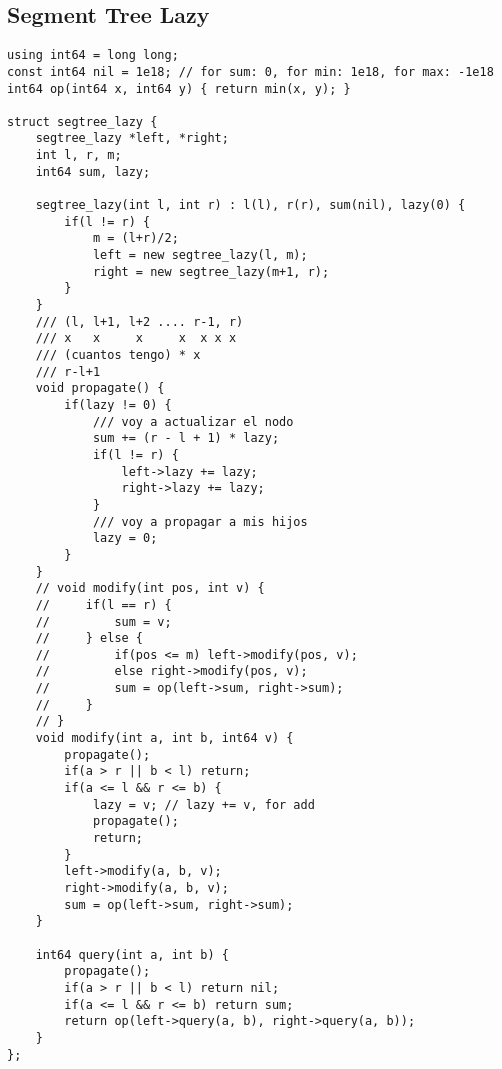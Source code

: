 \documentclass[10pt,letterpaper,twocolumn,twosided]{article}
\begin{document}
\subsection{Segment Tree Lazy}
\begin{lstlisting}
using int64 = long long;
const int64 nil = 1e18; // for sum: 0, for min: 1e18, for max: -1e18
int64 op(int64 x, int64 y) { return min(x, y); }

struct segtree_lazy {
    segtree_lazy *left, *right;
    int l, r, m;
    int64 sum, lazy;

    segtree_lazy(int l, int r) : l(l), r(r), sum(nil), lazy(0) {
        if(l != r) {
            m = (l+r)/2;
            left = new segtree_lazy(l, m);
            right = new segtree_lazy(m+1, r);
        }
    }
    /// (l, l+1, l+2 .... r-1, r)
    /// x   x     x     x  x x x 
    /// (cuantos tengo) * x
    /// r-l+1
    void propagate() {
        if(lazy != 0) {
            /// voy a actualizar el nodo
            sum += (r - l + 1) * lazy;
            if(l != r) {
                left->lazy += lazy;
                right->lazy += lazy;
            }
            /// voy a propagar a mis hijos
            lazy = 0;
        }
    }
    // void modify(int pos, int v) {
    //     if(l == r) {
    //         sum = v;
    //     } else {
    //         if(pos <= m) left->modify(pos, v);
    //         else right->modify(pos, v);
    //         sum = op(left->sum, right->sum);
    //     }
    // }
    void modify(int a, int b, int64 v) {
        propagate();
        if(a > r || b < l) return;
        if(a <= l && r <= b) {
            lazy = v; // lazy += v, for add
            propagate();
            return;
        }
        left->modify(a, b, v);
        right->modify(a, b, v);
        sum = op(left->sum, right->sum);
    }

    int64 query(int a, int b) {
        propagate();
        if(a > r || b < l) return nil;
        if(a <= l && r <= b) return sum;
        return op(left->query(a, b), right->query(a, b));
    }
};
\end{lstlisting}
\end{document}
